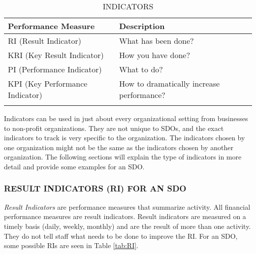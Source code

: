 \documentclass[SDSUThesis.tex]{subfiles}
\begin{document}
        \begin{longtable}{@{}l l}
            \toprule%
             \centering%
             {\bfseries Performance Measure}
             & {\bfseries Description}\\
            
            \cmidrule[0.4pt](r{0.125em}){1-1}%
            \cmidrule[0.4pt](lr{0.125em}){2-2}%
            \endhead
            
            RI (Result Indicator) & What has been done?   \\
            \myrowcolour%
            KRI (Key Result Indicator) & How you have done? \\
            PI (Performance Indicator) & What to do? \\
            \myrowcolour%
            KPI (Key Performance Indicator) & How to dramatically increase performance? \\
            
            \bottomrule
            
            \caption{INDICATORS}
            \label{tab:indicators}
        \end{longtable}
            
        Indicators can be used in just about every organizational
        setting from businesses to non-profit organizations. They
        are not unique to SDOs, and the exact indicators to track
        is very specific to the organization.  The indicators chosen
        by one organization might not be the same as the indicators
        chosen by another organization.  The following sections
        will explain the type of indicators in more detail and provide
        some examples for an SDO.
        
        \subsubsection{RESULT INDICATORS (RI) FOR AN SDO}
            \textit{Result Indicators} are performance 
            measures that summarize activity.  All financial performance
            measures are result indicators.  Result indicators
            are measured on a timely basis (daily, weekly, monthly)
            and are the result of more than one activity.  They do not
            tell staff what needs to be done to improve the RI. For
            an SDO, some possible RIs are seen in Table \ref{tab:RI}.
            
\end{document}
